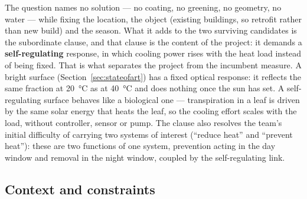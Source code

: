\medskip
\noindent{}

\medskip
The question names no solution --- no coating, no greening, no geometry, no
water --- while fixing the location, the object (existing buildings, so retrofit
rather than new build) and the season. What it adds to the two surviving
candidates is the subordinate clause, and that clause is the content of the
project: it demands a \textbf{self-regulating} response, in which cooling power
rises with the heat load instead of being fixed. That is what separates the
project from the incumbent measure. A bright surface
(Section~\ref{sec:stateofart}) has a fixed optical response: it reflects the
same fraction at \qty{20}{\celsius} as at \qty{40}{\celsius} and does nothing
once the sun has set. A self-regulating surface behaves like a biological one
--- transpiration in a leaf is driven by the same solar energy that heats the
leaf, so the cooling effort scales with the load, without controller, sensor or
pump. The clause also resolves the team's initial difficulty of carrying two
systems of interest (\enquote{reduce heat} and \enquote{prevent heat}): these
are two functions of one system, prevention acting in the day window and removal
in the night window, coupled by the self-regulating link.

\subsection{Context and constraints}
\label{sec:context}

